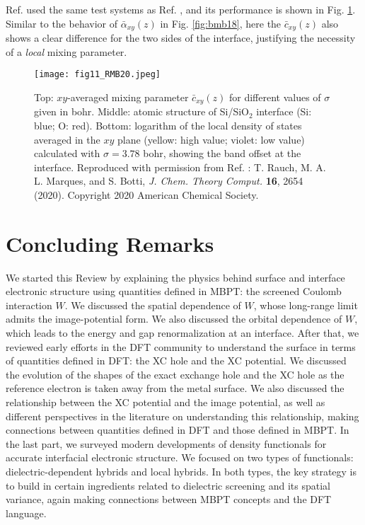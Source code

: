 \documentclass[aip, amsmath, amssymb, reprint, longbibliography]{revtex4-2}
\begin{document}
Ref.  used the same test systems as Ref. , and its performance is shown in Fig. \ref{fig:RMB20}. Similar to the behavior of $\bar{\alpha}_{xy}(z)$ in Fig. \ref{fig:bmb18}, here the $\bar{c}_{xy}(z)$ also shows a clear difference for the two sides of the interface, justifying the necessity of a \emph{local} mixing parameter.

\begin{figure}[htp]
\centering
\texttt{[image: fig11\_RMB20.jpeg]}
\caption{Top: $xy$-averaged mixing parameter $\bar{c}_{xy}(z)$ for different values of $\sigma$ given in bohr. Middle: atomic structure of Si/SiO$_2$ interface (Si: blue; O: red). Bottom: logarithm of the local density of states averaged in the $xy$ plane (yellow: high value; violet: low value) calculated with $\sigma=3.78$ bohr, showing the band offset at the interface. Reproduced with
permission from Ref. : T. Rauch, M. A. L. Marques, and S. Botti, \emph{J. Chem. Theory Comput.} \textbf{16}, 2654 (2020). Copyright 2020 American Chemical Society.}
\label{fig:RMB20}
\end{figure}

\section{Concluding Remarks}
\label{sec:outlook}
We started this Review by explaining the physics behind surface and interface electronic structure using quantities defined in MBPT: the screened Coulomb interaction $W$. We discussed the spatial dependence of $W$, whose long-range limit admits the image-potential form. We also discussed the orbital dependence of $W$, which leads to the energy and gap renormalization at an interface. After that, we reviewed early efforts in the DFT community to understand the surface in terms of quantities defined in DFT: the XC hole and the XC potential. We discussed the evolution of the shapes of the exact exchange hole and the XC hole as the reference electron is taken away from the metal surface. We also discussed the relationship between the XC potential and the image potential, as well as different perspectives in the literature on understanding this relationship, making connections between quantities defined in DFT and those defined in MBPT. In the last part, we surveyed modern developments of density functionals for accurate interfacial electronic structure. We focused on two types of functionals: dielectric-dependent hybrids and local hybrids. In both types, the key strategy is to build in certain ingredients related to dielectric screening and its spatial variance, again making connections between MBPT concepts and the DFT language.
\end{document}
